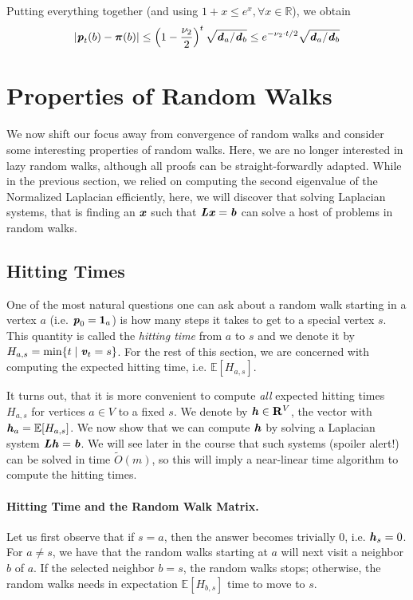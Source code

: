 Putting everything together (and using $1+x \leq e^x, \forall x \in \mathbb{R}$), we obtain 
\[  
    |\boldsymbol{\mathit{p}}_t(b) - \boldsymbol{\pi}(b)| \leq \left(1-\frac{\nu_2}{2}\right)^t \sqrt{\boldsymbol{\mathit{d}}_a/\boldsymbol{\mathit{d}}_b} \leq e^{-\nu_2 \cdot t/2} \sqrt{\boldsymbol{\mathit{d}}_a/\boldsymbol{\mathit{d}}_b} 
\]

\section{Properties of Random Walks}

We now shift our focus away from convergence of random walks and consider some interesting properties of random walks. Here, we are no longer interested in lazy random walks, although all proofs can be straight-forwardly adapted. While in the previous section, we relied on computing the second eigenvalue of the Normalized Laplacian efficiently, here, we will discover that solving Laplacian systems, that is finding an $\boldsymbol{\mathit{x}}$ such that $\boldsymbol{\mathit{L}}\boldsymbol{\mathit{x}} = \boldsymbol{\mathit{b}}$ can solve a host of problems in random walks.

\subsection{Hitting Times}

One of the most natural questions one can ask about a random walk starting in a vertex $a$ (i.e. $\boldsymbol{\mathit{p}}_0 = \boldsymbol{1}_a$) is how many steps it takes to get to a special vertex $s$. This quantity is called the \emph{hitting time} from $a$ to $s$ and we denote it by $H_{a,s} = \min \{ t \;|\; \boldsymbol{\mathit{v}}_t = s \}$. For the rest of this section, we are concerned with computing the expected hitting time, i.e. $\mathbb{E}[H_{a,s}]$.

It turns out, that it is more convenient to compute \emph{all} expected hitting times $H_{a,s}$ for vertices $a \in V$ to a fixed $s$. We denote by ${\boldsymbol{\mathit{h}}} \in \mathbf{R}^V$, the vector with ${\boldsymbol{\mathit{h}}}_a = \mathbb{E}[H_{a,s}]$. We now show that we can compute ${\boldsymbol{\mathit{h}}}$ by solving a Laplacian system $\boldsymbol{\mathit{L}} {\boldsymbol{\mathit{h}}} = \boldsymbol{\mathit{b}}$. We will see later in the course that such systems (spoiler alert!) can be solved in time $\tilde{O}(m)$, so this will imply a near-linear time algorithm to compute the hitting times.

\paragraph{Hitting Time and the Random Walk Matrix.} Let us first observe that if $s = a$, then the answer becomes trivially $0$, i.e. ${\boldsymbol{\mathit{h}}}_s = 0$. For $a \neq s$, we have that the random walks starting at $a$ will next visit a neighbor $b$ of $a$. If the selected neighbor $b = s$, the random walks stops; otherwise, the random walks needs in expectation $\mathbb{E}[H_{b,s}]$ time to move to $s$. 


